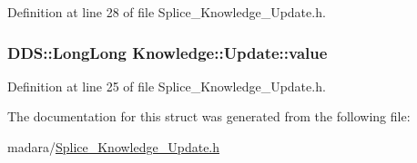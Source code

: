 Definition at line 28 of file Splice\_\-Knowledge\_\-Update.h.

\hypertarget{structKnowledge_1_1Update_a1890484966bfe55a5602fe6c1883a802}{
\subsubsection[{value}]{\setlength{\rightskip}{0pt plus 5cm}DDS::LongLong {\bf Knowledge::Update::value}}}
\label{df/ddf/structKnowledge_1_1Update_a1890484966bfe55a5602fe6c1883a802}


Definition at line 25 of file Splice\_\-Knowledge\_\-Update.h.



The documentation for this struct was generated from the following file:\begin{DoxyCompactItemize}
\item 
madara/\hyperlink{Splice__Knowledge__Update_8h}{Splice\_\-Knowledge\_\-Update.h}\end{DoxyCompactItemize}
